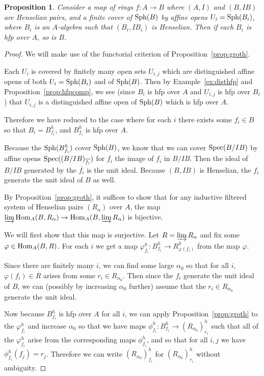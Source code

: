 \documentclass[12pt]{article}
\newcommand{\spec}{{\rm Spec}}
\newcommand{\sph}{{\rm Sph}}
\newcommand{\Hom}{{\rm Hom}}
\newcommand{\colim}{\varinjlim}
\newcommand{\ol}[1]{\overline{#1}}
\newcommand{\vp}{\varphi}
\newcommand{\hfp}{hfp\xspace}
\newtheorem{proposition}[theorem]{Proposition}
\theoremstyle{definition}
\numberwithin{equation}{subsection}
\begin{document}
\begin{proposition}\label{prop:affglue} 
Consider a map of rings $f: A \to B$ where $(A,I)$ and $(B,IB)$ are Henselian pairs, and a finite cover of $\sph(B)$ by affine opens $U_i = \sph(B_i)$, where $B_i$ is an $A$-algebra such that $(B_i,IB_i)$ is Henselian. Then if each $B_i$ is \hfp over $A$, so is $B$.
\end{proposition}
\begin{proof} We will make use of the functorial criterion of Proposition~\ref{prop:groth}. 


Each $U_i$ is covered by finitely many open sets $U_{i,j}$ which are distinguished affine opens of both $U_i=\sph(B_i)$ and of $\sph(B)$. Then by Example~\ref{ex:disthfp} and Proposition~\ref{prop:hfpcomp}, we see (since $B_i$ is \hfp over $A$ and $U_{i,j}$ is \hfp over $B_i$) that $U_{i,j}$ is a distinguished affine open of $\sph(B)$ which is \hfp over $A$.

Therefore we have reduced to the case where for each $i$ there exists some $f_i \in B$ so that $B_i=B_{f_i}^h$, and $B_{f_i}^h$ is \hfp over $A$. 

Because the $\sph(B_{f_i}^h)$ cover $\sph(B)$, we know that we can cover $\spec(B/IB)$ by affine opens $\spec((B/IB)_{\ol{f_i}})$ for $\ol{f_i}$ the image of $f_i$ in $B/IB$. Then the ideal of $B/IB$ generated by the $\ol{f_i}$ is the unit ideal. Because $(B,IB)$ is Henselian, the $f_i$ generate the unit ideal of $B$ as well.

By Proposition~\ref{prop:groth}, it suffices to show that for any inductive filtered system of Henselian pairs $(R_\alpha)$ over $A$, the map $\colim \Hom_A(B,R_\alpha) \to \Hom_A(B,\colim R_\alpha)$ is bijective.

We will first show that this map is surjective. Let $R=\colim R_\alpha$ and fix some $\vp \in \Hom_A(B,R)$. For each $i$ we get a map $\vp_{f_i}^h: B_{f_i}^h \to R_{\vp(f_i)}^h$ from the map $\vp$. 

Since there are finitely many $i$, we can find some large $\alpha_0$ so that for all $i$, $\vp(f_i) \in R$ arises from some $r_i \in R_{\alpha_0}$. Then since the $f_i$ generate the unit ideal of $B$, we can (possibly by increasing $\alpha_0$ further) assume that the $r_i \in R_{\alpha_0}$ generate the unit ideal.

Now because $B_{f_i}^h$ is \hfp over $A$ for all $i$, we can apply Proposition~\ref{prop:groth} to the $\vp_{f_i}^h$ and increase $\alpha_0$ so that we have maps $\phi_{f_i}^h: B_{f_i}^h \to (R_{\alpha_0})_{r_i}^h$ such that all of the $\vp_{f_i}^h$ arise from the corresponding maps $\phi_{f_i}^h$, and so that for all $i,j$ we have $\phi_{f_i}^h(f_j)=r_j$. Therefore we can write $(R_{\alpha_0})_{f_i}^h$ for $(R_{\alpha_0})_{r_i}^h$ without ambiguity.


\end{proof}
\end{document}
